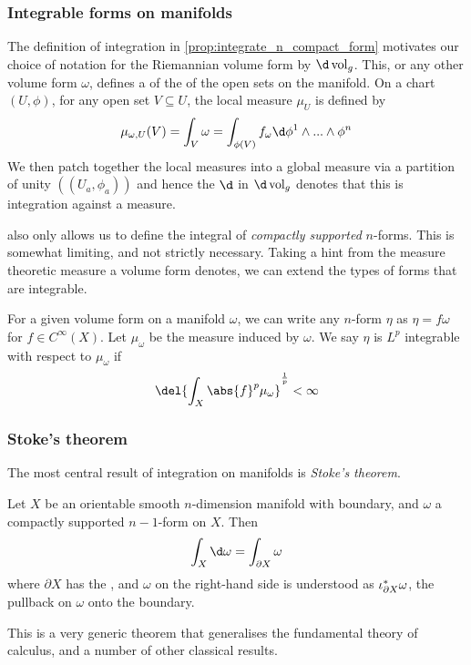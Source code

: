 \subsubsection{Integrable forms on manifolds}

The definition of integration in \cref{prop:integrate_n_compact_form} motivates our choice of notation for the Riemannian volume form by \(\d\vol_g\).
This, or any other volume form  \(\omega\), defines a  of the  of the open sets on the manifold.
On a chart \((U, \phi)\), for any open set \(V \subseteq U\), the local measure \(\mu_U\) is defined by
\[
	\mu_{\omega,U}(V) = \int_V \omega = \int_{\phi(V)} f_\omega \d\phi^1\wedge ... \wedge \phi^n
\]
We then patch together the local measures into a global measure via a partition of unity \(((U_a, \phi_a))\)
and hence the \(\d\) in \(\d\vol_g\) denotes that this is integration against a measure.

 also only allows us to define the integral of \emph{compactly supported} \(n\)-forms.
This is somewhat limiting, and not strictly necessary.
Taking a hint from the measure theoretic measure a volume form denotes, we can extend the types of forms that are integrable.

For a given volume form on a manifold \(\omega\), we can write any \(n\)-form \(\eta\) as \(\eta = f \omega\) for \(f\in C^\infty(X)\).
Let \(\mu_\omega\) be the measure induced by \(\omega\).
We say \(\eta\) is \(L^p\) integrable with respect to \(\mu_\omega\) if 
\[
	\del{\int_X \abs{f}^p \mu_\omega}^\frac{1}{p} < \infty
\]

\subsubsection{Stoke's theorem}
The most central result of integration on manifolds is \emph{Stoke's theorem}.
\begin{theorem}
	Let \(X\) be an orientable smooth \(n\)-dimension manifold with boundary, and \(\omega\) a compactly supported \(n-1\)-form on \(X\).
	Then \[\int_X \d \omega = \int_{\partial X} \omega \]
	where \(\partial X\) has the , and \(\omega\) on the right-hand side is understood as \(\iota^*_{\partial X} \omega\), the pullback on \(\omega\) onto the boundary.
\end{theorem}
This is a very generic theorem that generalises the fundamental theory of calculus, and a number of other classical results.

